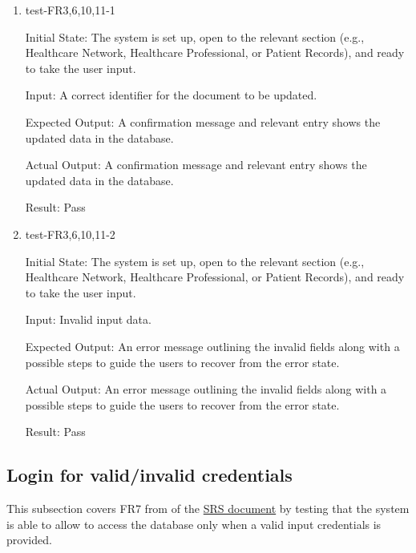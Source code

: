 \documentclass[12pt, titlepage]{article}
\begin{document}
\begin{enumerate}

  \item{test-FR3,6,10,11-1} \label{test-FR3,6,10,11-1}
  
  Initial State: The system is set up, open to the relevant section (e.g., Healthcare Network, Healthcare Professional, or Patient Records), and ready to take the user input.

  Input: A correct identifier for the document to be updated.

  Expected Output: A confirmation message and relevant entry shows the updated data in the database.

  Actual Output: A confirmation message and relevant entry shows the updated data in the database.

  Result: Pass


  \item{test-FR3,6,10,11-2} \label{test-FR3,6,10,11-2}

  Initial State:  The system is set up, open to the relevant section (e.g., Healthcare Network, Healthcare Professional, or Patient Records), and ready to take the user input.

  Input: Invalid input data.

  Expected Output: An error message outlining the invalid fields along with a possible steps to guide the users to recover from the error state.

  Actual Output: An error message outlining the invalid fields along with a possible steps to guide the users to recover from the error state.

  Result: Pass

\end{enumerate}

\subsection{Login for valid/invalid credentials} \label{section:3.4}

This subsection covers FR7 from of the \href{https://github.com/Inreet-Kaur/capstone/blob/main/docs/SRS/SRS.pdf} {SRS document} by testing that the system is able to allow to access the database only when a valid input credentials is provided.
\end{document}
